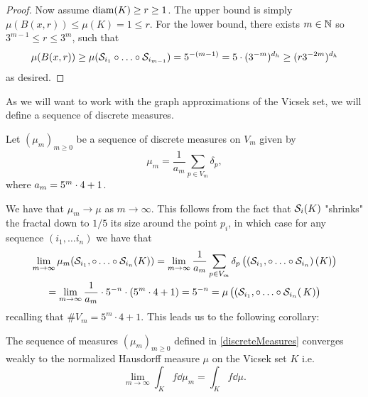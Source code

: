 \begin{proof}
	Now assume $\operatorname{diam}(K) \geq r \geq 1$. The upper bound is simply $\mu(B(x,r)) \leq \mu(K) = 1 \leq r$. For the lower bound, there exists $m \in \mathbb{N}$ so $3^{m-1}\leq  r \leq 3^{m}$, such that
	\begin{equation}
		\mu(B(x,r)) \geq \mu(\mathcal{S}_{i_1} \circ \ldots \circ \mathcal{S}_{i_{m-1}}) = 5^{-(m-1)} = 5 \cdot (3^{-m})^{d_h} \geq  (r3^{-2m})^{d_h}
	\end{equation}
	as desired.
\end{proof}

As we will want to work with the graph approximations of the Vicsek set, we will define a sequence of discrete measures.
\medskip
\begin{defi} Let $(\mu_{m})_{m \geq 0}$ be a sequence of discrete measures on $V_m$ given by
	\begin{equation}\label{discreteMeasures}
		\mu_m = \frac{1}{a_m} \sum_{p \in V_m} \delta_p,
	\end{equation}
	where $a_m = 5^{m}\cdot 4 + 1$. 
\end{defi}

\medskip
We have that $\mu_m \to \mu$ as $m \to \infty$. This follows from the fact that $\mathcal{S}_i(K)$ "shrinks" the fractal down to $1/5$ its size around the point $p_i$, in which case for any sequence $(i_1, \ldots i_n)$ we have that
\begin{multline}
	\lim_{m \to \infty} \mu_m(\fracConst_{i_1},\circ \ldots \circ \fracConst_{i_n}(K)) = \lim_{m \to \infty}\frac{1}{a_m} \sum_{p \in V_m} \delta_p \left(\left(\fracConst_{i_1},\circ \ldots \circ \fracConst_{i_n}\right)(K)\right) \\
	= \lim_{m \to \infty} \frac{1}{a_m} \cd 5^{-n} \cd (5^{m}\cd 4 +1) = 5^{-n} = \mu\left( \left(\fracConst_{i_1},\circ \ldots \circ \fracConst_{i_n}\right(K) \right) 
\end{multline}
recalling that $\# V_m = 5^{m}\cdot 4 + 1$. This leads us to the following corollary:

\medskip
\begin{coro}\label{convergenceOfMeasures}
	The sequence of measures $(\mu_m)_{m \geq 0}$ defined in \eqref{discreteMeasures} converges weakly to the normalized Hausdorff measure $\mu$ on the Vicsek set $K$ i.e.
	\begin{equation}
		\lim_{m \to \infty} \int_{K}f \dd \mu_m = \int_{K} f \dd \mu.
	\end{equation}
\end{coro}
 